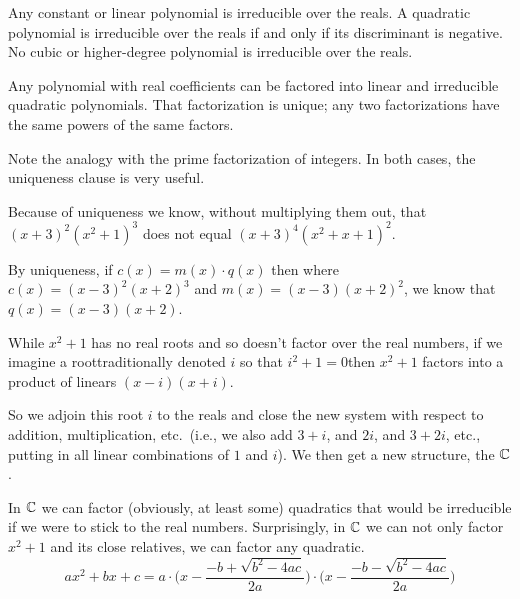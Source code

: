 \begin{theorem}
Any constant or linear polynomial is irreducible over the reals.
A quadratic polynomial is irreducible over the reals if and only if its
discriminant is negative.
No cubic or higher-degree polynomial is irreducible over the reals.
\end{theorem}

\begin{corollary}
Any polynomial with real coefficients can be factored into linear and
irreducible quadratic polynomials.
That factorization is unique; any two factorizations have the same powers of
the same factors.
\end{corollary}

Note the analogy with the prime factorization of integers.
In both cases, the uniqueness clause is very useful.

\begin{example}
Because of uniqueness we know, without multiplying them out, that
\( (x+3)^2(x^2+1)^3 \) does not equal
\( (x+3)^4(x^2+x+1)^2 \).
\end{example}

\begin{example}
By uniqueness, if \( c(x)=m(x)\cdot q(x) \) then where
\( c(x)=(x-3)^2(x+2)^3 \) and \( m(x)=(x-3)(x+2)^2 \),
we know that \( q(x)=(x-3)(x+2) \).
\end{example}

While \( x^2+1 \) has no real roots and so doesn't factor over the real
numbers, if we imagine a root\Dash traditionally denoted \( i \) 
so that \( i^2+1=0 \)\Dash then \( x^2+1 \) factors into a product of linears
\( (x-i)(x+i) \).

So we adjoin this root \( i \) to the reals and close the new system with
respect to addition, multiplication, etc.\ (i.e., we also add
\( 3+i \), and \( 2i \), and \( 3+2i \), etc., putting in all linear
combinations of $1$ and $i$).
We then get a new structure, the 
\( \mathbb{C} \).

In $\mathbb{C}$ we can factor (obviously, at least some) quadratics that would be
irreducible if we were to stick to the real numbers.
Surprisingly, in \( \mathbb{C} \) we can not only factor \( x^2+1 \)
and its close relatives, we can factor any quadratic.
\begin{equation*}
   ax^2+bx+c=
   a\cdot \big(x-\frac{-b+\sqrt{b^2-4ac}}{2a}\big)
    \cdot \big(x-\frac{-b-\sqrt{b^2-4ac}}{2a}\big)
\end{equation*}

